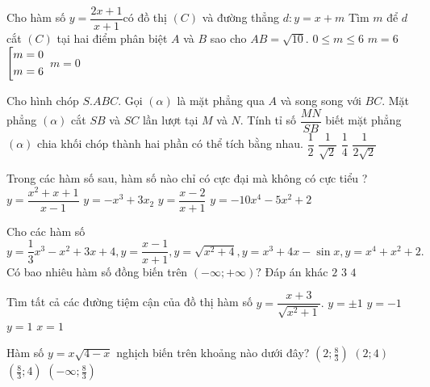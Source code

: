 \begin{ex}%
Cho hàm số $y=\dfrac{2x+1}{x+1}$có đồ thị $(C)$ và đường thẳng $d:y=x+m $ Tìm $m$ để $d$ cắt $(C)$ tại
hai điểm phân biệt $A$ và $B$ sao cho $AB=\sqrt{10}.$
\choice
{$0\leq m\leq 6$}
{$m=6$}
{\True $\left[\begin{aligned}m=0\\m=6\end{aligned}\right.$}
{$m=0$}
\end{ex}
\begin{ex}%
Cho hình chóp $S.ABC$. Gọi $(\alpha)$ là mặt phẳng qua $A$ và song song với $BC$. Mặt phẳng $(\alpha)$ cắt $SB$ và $SC$ lần lượt tại $M$ và $N$. Tính tỉ số $\dfrac{MN}{SB}$
biết mặt phẳng $ (\alpha) $ chia khối chóp thành hai phần có thể tích bằng nhau.
\choice
{$\dfrac{1}{2}$}
{\True $\dfrac{1}{\sqrt{2}}$}
{$\dfrac{1}{4}$}
{$\dfrac{1}{2\sqrt{2}}$}
\end{ex}
\begin{ex}%
Trong các hàm số sau, hàm số nào chỉ có cực đại mà không có cực tiểu ?
\choice
{$y=\dfrac{x^2+x+1}{x-1}$}
{$y=-x^3+3x_2$}
{$y=\dfrac{x-2}{x+1}$}
{\True $y=-10x^4-5x^2+2$}
\end{ex}
\begin{ex}%
Cho các hàm số $y=\dfrac{1}{3}x^3-x^2+3x+4, y=\dfrac{x-1}{x+1}, y=\sqrt{x^2+4}, y=x^3+4x-\sin x, y=x^4+x^2+2.$ Có bao nhiêu hàm số đồng biến trên $(-\infty;+\infty)?$
\choice
{Đáp án khác}
{\True $2$}
{$3$}
{$4$}
\end{ex}
\begin{ex}%
Tìm tất cả các đường tiệm cận của đồ thị hàm số $y=\dfrac{x+3}{\sqrt{x^2+1}}.$
\choice
{\True $y=\pm 1$}
{$y=-1$}
{$y=1$}
{$x=1$}
\end{ex}
\begin{ex}%
Hàm số $y=x\sqrt{4-x}$ nghịch biến trên khoảng nào dưới đây?
\choice
{$\left( { 2 ;\frac{8}{3}} \right)$}
{$(2;4)$}
{\True $\left( { \frac{8}{3} ;4} \right)$}
{$\left( { - \infty ;\frac{8}{3}} \right)$}
\end{ex}
